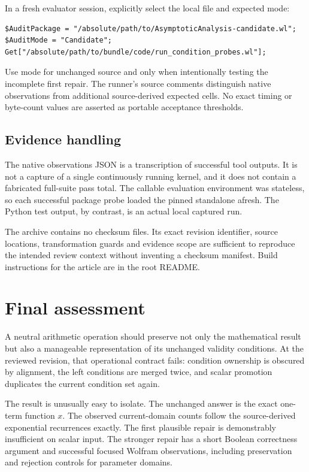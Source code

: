 \documentclass[11pt,a4paper]{article}
\newcommand{\code}[1]{\texttt{\detokenize{#1}}}
\begin{document}
In a fresh evaluator session, explicitly select the local file and expected mode:
\begin{lstlisting}
$AuditPackage = "/absolute/path/to/AsymptoticAnalysis-candidate.wl";
$AuditMode = "Candidate";
Get["/absolute/path/to/bundle/code/run_condition_probes.wl"];
\end{lstlisting}
Use mode \code{"Baseline"} for unchanged source and \code{"MergeOnly"} only when intentionally testing the incomplete first repair. The runner's source comments distinguish native observations from additional source-derived expected cells. No exact timing or byte-count values are asserted as portable acceptance thresholds.

\subsection{Evidence handling}
The native observations JSON is a transcription of successful tool outputs. It is not a capture of a single continuously running kernel, and it does not contain a fabricated full-suite pass total. The callable evaluation environment was stateless, so each successful package probe loaded the pinned standalone afresh. The Python test output, by contrast, is an actual local captured run.

The archive contains no checksum files. Its exact revision identifier, source locations, transformation guards and evidence scope are sufficient to reproduce the intended review context without inventing a checksum manifest. Build instructions for the article are in the root README.

\section{Final assessment}
A neutral arithmetic operation should preserve not only the mathematical result but also a manageable representation of its unchanged validity conditions. At the reviewed revision, that operational contract fails: condition ownership is obscured by alignment, the left conditions are merged twice, and scalar promotion duplicates the current condition set again.

The result is unusually easy to isolate. The unchanged answer is the exact one-term function $x$. The observed current-domain counts follow the source-derived exponential recurrences exactly. The first plausible repair is demonstrably insufficient on scalar input. The stronger repair has a short Boolean correctness argument and successful focused Wolfram observations, including preservation and rejection controls for parameter domains.
\end{document}
